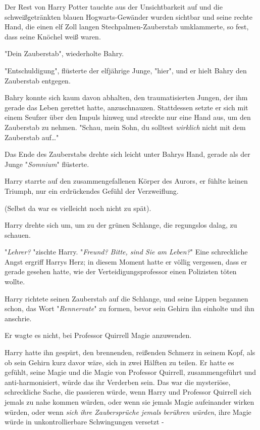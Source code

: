{Der Rest von Harry Potter tauchte aus der Unsichtbarkeit auf und die schweißgetränkten blauen Hogwarts-Gewänder wurden sichtbar und seine rechte Hand, die einen elf Zoll langen Stechpalmen-Zauberstab umklammerte, so fest, dass seine Knöchel weiß waren.

"Dein Zauberstab", wiederholte Bahry.

"Entschuldigung", flüsterte der elfjährige Junge, "hier", und er hielt Bahry den Zauberstab entgegen.

Bahry konnte sich kaum davon abhalten, den traumatisierten Jungen, der ihm gerade das Leben gerettet hatte, anzuschnauzen. Stattdessen setzte er sich mit einem Seufzer über den Impuls hinweg und streckte nur eine Hand aus, um den Zauberstab zu nehmen. "Schau, mein Sohn, du solltest \emph{wirklich} nicht mit dem Zauberstab auf…"

Das Ende des Zauberstabs drehte sich leicht unter Bahrys Hand, gerade als der Junge "\emph{Somnium}" flüsterte.

Harry starrte auf den zusammengefallenen Körper des Aurors, er fühlte keinen Triumph, nur ein erdrückendes Gefühl der Verzweiflung.

(Selbst da war es vielleicht noch nicht zu spät).

Harry drehte sich um, um zu der grünen Schlange, die regungslos dalag, zu schauen.

"\emph{Lehrer?} "zischte Harry. "\emph{Freund? Bitte, sind Sie am Leben?}" Eine schreckliche Angst ergriff Harrys Herz; in diesem Moment hatte er völlig vergessen, dass er gerade gesehen hatte, wie der Verteidigungsprofessor einen Polizisten töten wollte.

Harry richtete seinen Zauberstab auf die Schlange, und seine Lippen begannen schon, das Wort "\emph{Rennervate}" zu formen, bevor sein Gehirn ihn einholte und ihn anschrie.

Er wagte es nicht, bei Professor Quirrell Magie anzuwenden.

Harry hatte ihn gespürt, den brennenden, reißenden Schmerz in seinem Kopf, als ob sein Gehirn kurz davor wäre, sich in zwei Hälften zu teilen. Er hatte es gefühlt, seine Magie und die Magie von Professor Quirrell, zusammengeführt und anti-harmonisiert, würde das ihr Verderben sein. Das war die mysteriöse, schreckliche Sache, die passieren würde, wenn Harry und Professor Quirrell sich jemals zu nahe kommen würden, oder wenn sie jemals Magie aufeinander wirken würden, oder wenn \emph{sich ihre Zaubersprüche jemals berühren würden}, ihre Magie würde in unkontrollierbare Schwingungen versetzt -

}
